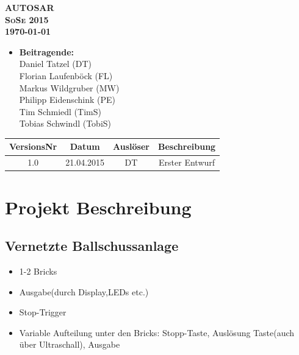 \documentclass[a4paper,11pt]{scrreprt}
\begin{document}
\begin{titlepage}

\vspace*{\fill}
  \begin{center}

\huge \bfseries AUTOSAR \\[2.5cm]

\textsc{\Large SoSe 2015}\\[0.5cm]

\large \today

\vfill

  \end{center}
\end{titlepage}

\begin{itemize}
\item[] \textbf{\large Beitragende:}\\
Daniel Tatzel (DT)\\
Florian Laufenböck (FL)\\
Markus Wildgruber (MW)\\
Philipp Eidenschink (PE)\\
Tim Schmiedl (TimS)\\
Tobias Schwindl (TobiS)
\end{itemize}

\bigskip

\begin{table}[!h]
 	\centering
	\begin{tabular}{|c|c|c|c|}
	\hline
	\textbf{VersionsNr} &  \textbf{Datum} & \textbf{Auslöser} & \textbf{Beschreibung} \\
	\hline
	1.0 & 21.04.2015 & DT & Erster Entwurf \\
	\hline
	\end{tabular}

\end{table}



\chapter{Projekt Beschreibung}

\section{Vernetzte Ballschussanlage}

\begin{itemize}
 \item 1-2 Bricks
 \item Ausgabe(durch Display,LEDs etc.)
 \item Stop-Trigger
 \item Variable Aufteilung unter den Bricks: Stopp-Taste, Auslösung Taste(auch über Ultraschall), Ausgabe
\end{itemize}
\end{document}
